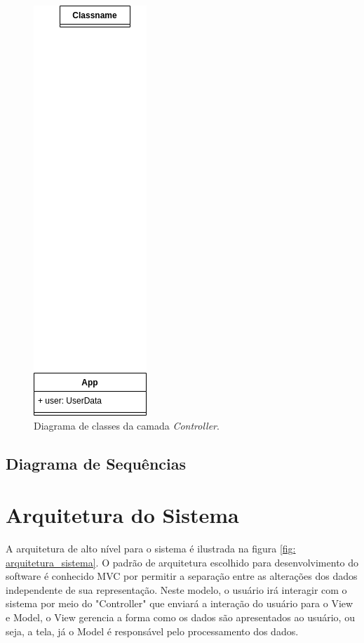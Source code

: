 \documentclass[a4paper,12pt]{article}
\begin{document}
\begin{figure}
    \centering
    \includegraphics{Diagrama de classes - controller.drawio.png}
    \caption{Diagrama de classes da camada \textit{Controller}.}
    \label{fig:diagrama-classes-controller}
\end{figure}

\subsection{Diagrama de Sequências}

\section{Arquitetura do Sistema}
A arquitetura de alto nível para o sistema é ilustrada na figura \ref{fig: arquitetura_sistema}. O padrão de arquitetura escolhido para desenvolvimento do software é conhecido MVC por permitir a separação entre as alterações dos dados independente de sua representação. Neste modelo, o usuário irá interagir com o sistema por meio do "Controller" que enviará a interação do usuário para o View e Model, o View gerencia a forma como os dados são apresentados ao usuário, ou seja, a tela, já o Model é responsável pelo processamento dos dados.
\end{document}
